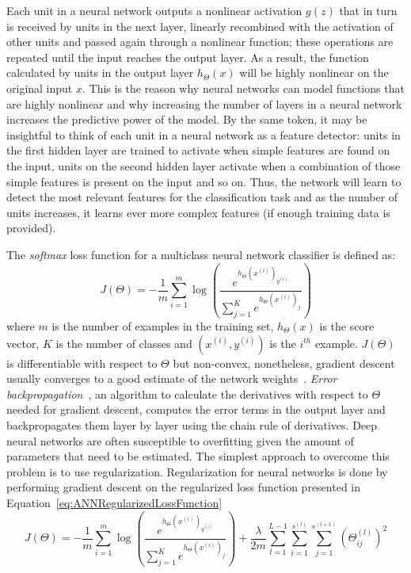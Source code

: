 Each unit in a neural network outputs a nonlinear activation $g(z)$ that in turn is received by units in the next layer, linearly recombined with the activation of other units and passed again through a nonlinear function; these operations are repeated until the input reaches the output layer. As a result, the function calculated by units in the output layer $h_\Theta(x)$ will be highly nonlinear on the original input $x$. This is the reason why neural networks can model functions that are highly nonlinear and why increasing the number of layers in a neural network increases the predictive power of the model. By the same token, it may be insightful to think of each unit in a neural network as a feature detector: units in the first hidden layer are trained to activate when simple features are found on the input, units on the second hidden layer activate when a combination of those simple features is present on the input and so on. Thus, the network will learn to detect the most relevant features for the classification task and as the number of units increases, it learns ever more complex features (if enough training data is provided).

The \emph{softmax} loss function for a multiclass neural network classifier is defined as:
\begin{equation}
	J(\Theta) = -\frac{1}{m} \sum_{i=1}^m \log \left ( \frac{ e^{h_\Theta(x^{(i)})_{y^{(i)}}} }{ \sum_{j=1}^K e^{ h_\Theta (x^{(i)})_j} } \right )
\end{equation}
where $m$ is the number of examples in the training set, $h_\Theta(x)$ is the score vector, $K$ is the number of classes and $(x^{(i)},y^{(i)})$ is the $i^{th}$ example. $J(\Theta)$ is differentiable with respect to $\Theta$ but non-convex, nonetheless, gradient descent usually converges to a good estimate of the network weights~\cite{Ng2014}. \emph{Error backpropagation}~\cite{Linnainmaa1970, Werbos1974}, an algorithm to calculate the derivatives with respect to $\Theta$ needed for gradient descent, computes the error terms in the output layer and backpropagates them layer by layer using the chain rule of derivatives. Deep neural networks are often susceptible to overfitting given the amount of parameters that need to be estimated. The simplest approach to overcome this problem is to use regularization. Regularization for neural networks is done by performing gradient descent on the regularized loss function presented in Equation~\ref{eq:ANNRegularizedLossFunction}
\begin{equation}
	J(\Theta) = -\frac{1}{m} \sum_{i=1}^m \log \left ( \frac{ e^{h_\Theta(x^{(i)})_{y^{(i)}}} }{ \sum_{j=1}^K e^{ h_\Theta (x^{(i)})_j} } \right ) + \frac{\lambda}{2m}\sum_{l=1}^{L-1}\sum_{i=1}^{s^{(l)}}\sum_{j=1}^{s^{(l+1)}} \left(\Theta^{(l)}_{ij}\right)^2
	\label{eq:ANNRegularizedLossFunction}
\end{equation}

